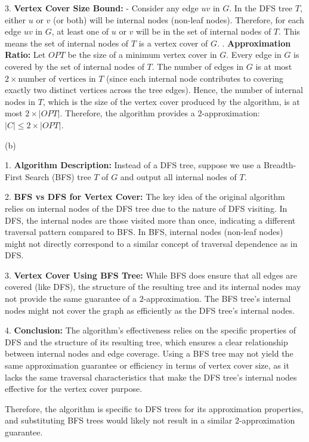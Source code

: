 \documentclass{oxmathproblems}
\begin{document}
\begin{questions}
3. \textbf{Vertex Cover Size Bound:}
   - Consider any edge \(uv\) in \(G\). In the DFS tree \(T\), either \(u\) or \(v\) (or both) will be internal nodes (non-leaf nodes).
   Therefore, for each edge \(uv\) in \(G\), at least one of \(u\) or \(v\) will be in the set of internal nodes of \(T\).
   This means the set of internal nodes of \(T\) is a vertex cover of \(G\).
. \textbf{Approximation Ratio:}
   Let \(OPT\) be the size of a minimum vertex cover in \(G\).
   Every edge in \(G\) is covered by the set of internal nodes of \(T\).
   The number of edges in \(G\) is at most \(2 \times \text{number of vertices in } T\) (since each internal node contributes to covering exactly two distinct vertices across the tree edges).
   Hence, the number of internal nodes in \(T\), which is the size of the vertex cover produced by the algorithm, is at most \(2 \times |OPT|\).
   Therefore, the algorithm provides a \(2\)-approximation: \(|C| \leq 2 \times |OPT|\).

(b)

1. \textbf{Algorithm Description:}
   Instead of a DFS tree, suppose we use a Breadth-First Search (BFS) tree \(T\) of \(G\) and output all internal nodes of \(T\).

2. \textbf{BFS vs DFS for Vertex Cover:}
   The key idea of the original algorithm relies on internal nodes of the DFS tree due to the nature of DFS visiting. In DFS, the internal nodes are those visited more than once, indicating a different traversal pattern compared to BFS.
   In BFS, internal nodes (non-leaf nodes) might not directly correspond to a similar concept of traversal dependence as in DFS.
   
3. \textbf{Vertex Cover Using BFS Tree:}
   While BFS does ensure that all edges are covered (like DFS), the structure of the resulting tree and its internal nodes may not provide the same guarantee of a \(2\)-approximation.
   The BFS tree's internal nodes might not cover the graph as efficiently as the DFS tree's internal nodes.

4. \textbf{Conclusion:}
   The algorithm's effectiveness relies on the specific properties of DFS and the structure of its resulting tree, which ensures a clear relationship between internal nodes and edge coverage.
   Using a BFS tree may not yield the same approximation guarantee or efficiency in terms of vertex cover size, as it lacks the same traversal characteristics that make the DFS tree's internal nodes effective for the vertex cover purpose. 

Therefore, the algorithm is specific to DFS trees for its approximation properties, and substituting BFS trees would likely not result in a similar \(2\)-approximation guarantee.
  

\end{questions}
\end{document}
